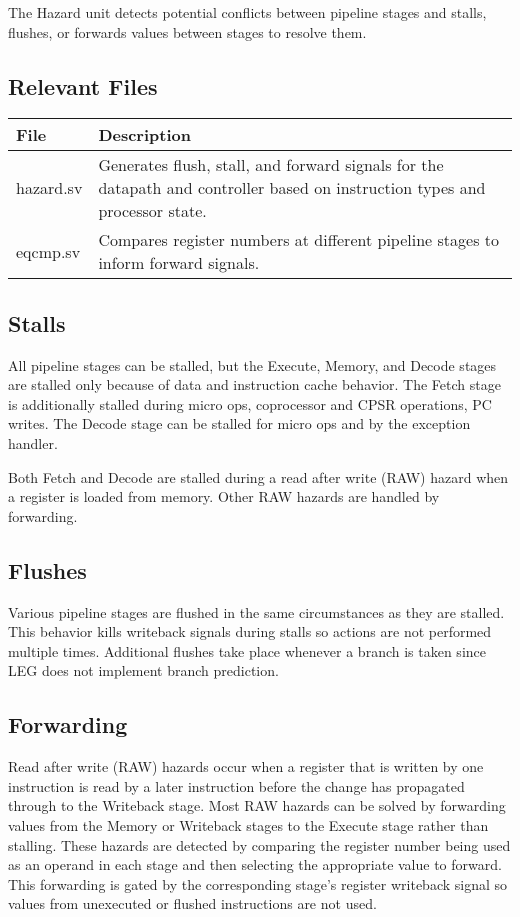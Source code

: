 \label{sec:h}
The Hazard unit detects potential conflicts between pipeline stages and stalls, flushes, or forwards values between stages to resolve them.

\subsection{Relevant Files}
\begin{tabular}{|l|p{120mm}|}
\hline \textbf{File}  & \textbf{Description} \\ 
\hline hazard.sv & Generates flush, stall, and forward signals for the datapath and controller based on instruction types and processor state. \\
\hline eqcmp.sv & Compares register numbers at different pipeline stages to inform forward signals. \\
\hline 
\end{tabular} 

\subsection{Stalls}
All pipeline stages can be stalled, but the Execute, Memory, and Decode stages are stalled only because of data and instruction cache behavior.
The Fetch stage is additionally stalled during micro ops, coprocessor and CPSR operations, PC writes.
The Decode stage can be stalled for micro ops and by the exception handler.

Both Fetch and Decode are stalled during a read after write (RAW) hazard when a register is loaded from memory. 
Other RAW hazards are handled by forwarding.

\subsection{Flushes}
Various pipeline stages are flushed in the same circumstances as they are stalled. 
This behavior kills writeback signals during stalls so actions are not performed multiple times.
Additional flushes take place whenever a branch is taken since LEG does not implement branch prediction.

\subsection{Forwarding}\label{sec:fwd}
Read after write (RAW) hazards occur when a register that is written by one instruction is read by a later instruction before the change has propagated through to the Writeback stage.
Most RAW hazards can be solved by forwarding values from the Memory or Writeback stages to the Execute stage rather than stalling.
These hazards are detected by comparing the register number being used as an operand in each stage and then selecting the appropriate value to forward. 
This forwarding is gated by the corresponding stage's register writeback signal so values from unexecuted or flushed instructions are not used.